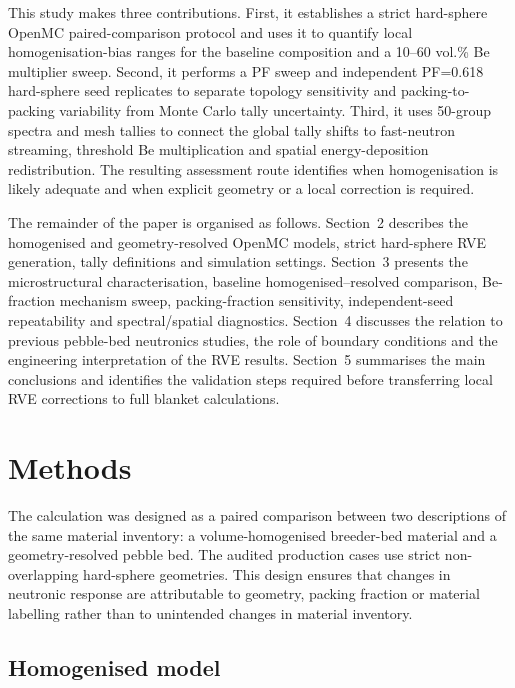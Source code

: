 \documentclass[preprint,12pt]{elsarticle}
\begin{document}
This study makes three contributions.  First, it establishes a strict
hard-sphere OpenMC paired-comparison protocol and uses it to quantify local
homogenisation-bias ranges for the baseline composition and a 10--60 vol.\% Be
multiplier sweep.  Second, it performs a PF sweep and independent PF=0.618
hard-sphere seed replicates to separate topology sensitivity and
packing-to-packing variability from Monte Carlo tally uncertainty.  Third, it
uses 50-group spectra and mesh tallies to connect the global tally shifts to
fast-neutron streaming, threshold Be multiplication and spatial energy-deposition
redistribution.  The resulting assessment route identifies when homogenisation
is likely adequate and when explicit geometry or a local correction is required.

The remainder of the paper is organised as follows.  Section~2 describes the
homogenised and geometry-resolved OpenMC models, strict hard-sphere RVE
generation, tally definitions and simulation settings.  Section~3 presents the
microstructural characterisation, baseline homogenised--resolved comparison,
Be-fraction mechanism sweep, packing-fraction sensitivity, independent-seed
repeatability and spectral/spatial diagnostics.  Section~4 discusses the
relation to previous pebble-bed neutronics studies, the role of boundary
conditions and the engineering interpretation of the RVE results.  Section~5
summarises the main conclusions and identifies the validation steps required
before transferring local RVE corrections to full blanket calculations.

\section{Methods}

The calculation was designed as a paired comparison between two descriptions of
the same material inventory: a volume-homogenised breeder-bed material and a
geometry-resolved pebble bed.  The audited production cases use strict
non-overlapping hard-sphere geometries.  This design ensures that changes in
neutronic response are attributable to geometry, packing fraction or material
labelling rather than to unintended changes in material inventory.

\subsection{Homogenised model}
\end{document}
